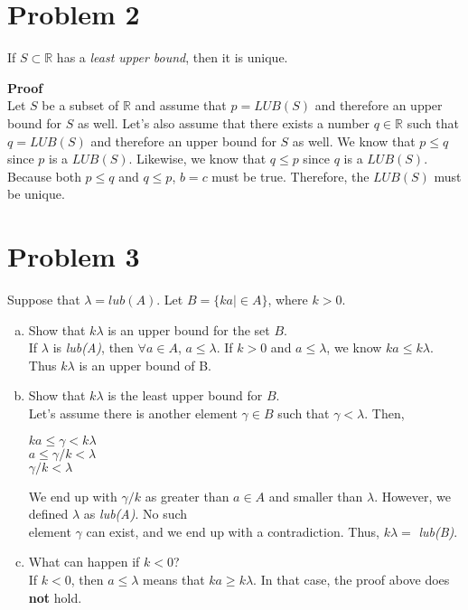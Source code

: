 \documentclass{article}
\begin{document}
\section*{Problem 2}
\begin{center}
If $S \subset \mathbb{R}$ has a \textit{least upper bound}, then it is unique.
\end{center}

\begin{flushleft}
\textbf{Proof} \\
\vspace{.5cm}
Let $S$ be a subset of $\mathbb{R}$ and assume that $p=LUB(S)$ and therefore an upper bound for $S$ as well. Let's also assume that there exists a number $q \in \mathbb{R}$ such that $q=LUB(S)$ and therefore an upper bound for $S$ as well. We know that $p \leq q$ since $p$ is a $LUB(S)$. Likewise, we know that $q \leq p$ since $q$ is a $LUB(S)$. Because both $p \leq q$ and $q \leq p$, $b=c$ must be true. Therefore, the $LUB(S)$ must be unique.
\end{flushleft}

\section*{Problem 3}
\begin{flushleft}
Suppose that $\lambda = lub(A)$. Let $B = \{ka | \in A \}$, where $k > 0$.
\begin{enumerate}[a)]
\item Show that $k\lambda$ is an upper bound for the set $B$.\\
\vspace{.5cm}
\qquad If $\lambda$ is \emph{lub(A)}, then $\forall a \in A$, $a \leq \lambda$. If $k > 0$ and $a \leq \lambda$, we know $ka \leq k\lambda$. Thus $k\lambda$ is an upper bound of B.

\item Show that $k\lambda$ is the least upper bound for $B$. \\
\vspace{.5cm}
\qquad Let's assume there is another element $\gamma \in B$ such that $\gamma < \lambda$. Then, 
\begin{center}
$ka \leq \gamma < k\lambda$\\
$a \leq \gamma / k < \lambda$\\
$\gamma / k < \lambda$\\
\end{center}
\qquad We end up with $\gamma / k$ as greater than $a \in A$ and smaller than $\lambda$. However, we defined $\lambda$ as \emph{lub(A)}. No such \\ 
\qquad element $\gamma$ can exist, and we end up with a contradiction. Thus, $k\lambda=$ \emph{lub(B)}.
\item What can happen if $k < 0$?\\
\vspace{.5cm}
\qquad If $k < 0$, then $a \leq \lambda$ means that $ka \geq k\lambda$. In that case, the proof above does \textbf{not} hold.

\end{enumerate}
\end{flushleft}
\end{document}
